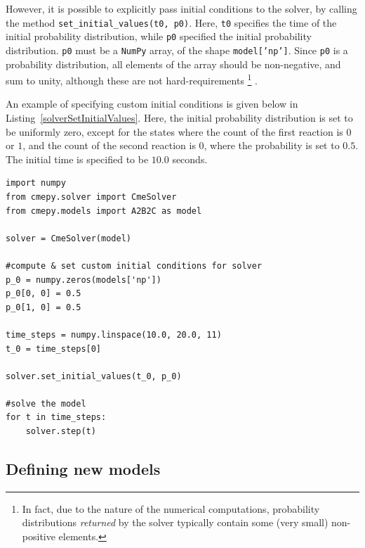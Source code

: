 \documentclass{article}
\newcommand{\mono}[1]{\texttt{#1}}
\newcommand{\numpy}{\mono{NumPy}}
\newcommand{\lstref}[1]{Listing~\ref{#1}}
\begin{document}
However, it is possible to explicitly pass initial conditions to the solver,
by calling the method \mono{set\_initial\_values(t0, p0)}. Here, \mono{t0}
specifies the time of the initial probability distribution, while \mono{p0}
specified the initial probability distribution. \mono{p0} must be a \numpy{}
array, of the shape \mono{model['np']}. Since \mono{p0}
is a probability distribution, all elements of the array should be non-negative,
and sum to unity, although these are not hard-requirements
\footnote
{
	In fact, due to the nature of the numerical computations, probability
	distributions \emph{returned} by the solver typically contain some
	(very small) non-positive elements.
}
.

An example of specifying custom initial conditions is given below in
\lstref{solverSetInitialValues}.
Here, the initial probability distribution is set to be uniformly zero,
except for the states where the count of the first
reaction is $0$ or $1$, and the count of the second reaction is $0$, where the
probability is set to $0.5$. The initial time is specified to be $10.0$ seconds.

\begin{lstlisting}[frame=tb,
caption={Example: specifying initial conditions},
label=solverSetInitialValues
]
import numpy
from cmepy.solver import CmeSolver
from cmepy.models import A2B2C as model

solver = CmeSolver(model)

#compute & set custom initial conditions for solver
p_0 = numpy.zeros(models['np'])
p_0[0, 0] = 0.5
p_0[1, 0] = 0.5

time_steps = numpy.linspace(10.0, 20.0, 11)
t_0 = time_steps[0]

solver.set_initial_values(t_0, p_0)

#solve the model
for t in time_steps:
	solver.step(t)
\end{lstlisting}

\subsection{Defining new models}
\label{subsectionModels}


\end{document}

